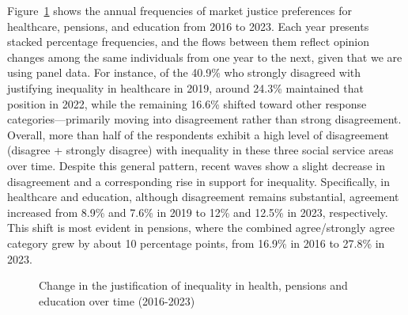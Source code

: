 \documentclass[
  12pt,
]{article}
\begin{document}
Figure~\ref{fig-alluvial} shows the annual frequencies of market justice
preferences for healthcare, pensions, and education from 2016 to 2023.
Each year presents stacked percentage frequencies, and the flows between
them reflect opinion changes among the same individuals from one year to
the next, given that we are using panel data. For instance, of the
40.9\% who strongly disagreed with justifying inequality in healthcare
in 2019, around 24.3\% maintained that position in 2022, while the
remaining 16.6\% shifted toward other response categories---primarily
moving into disagreement rather than strong disagreement. Overall, more
than half of the respondents exhibit a high level of disagreement
(disagree + strongly disagree) with inequality in these three social
service areas over time. Despite this general pattern, recent waves show
a slight decrease in disagreement and a corresponding rise in support
for inequality. Specifically, in healthcare and education, although
disagreement remains substantial, agreement increased from 8.9\% and
7.6\% in 2019 to 12\% and 12.5\% in 2023, respectively. This shift is
most evident in pensions, where the combined agree/strongly agree
category grew by about 10 percentage points, from 16.9\% in 2016 to
27.8\% in 2023.

\begin{figure}[H]

\caption{\label{fig-alluvial}Change in the justification of inequality
in health, pensions and education over time (2016-2023)}


\end{figure}%
\end{document}
